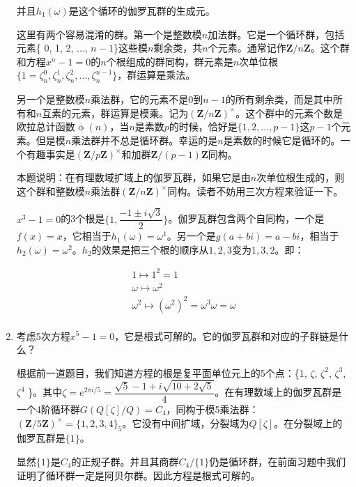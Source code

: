 \documentclass[UTF8]{article}
\begin{document}
\begin{enumerate}
并且$h_1(\omega)$是这个循环的伽罗瓦群的生成元。

\begin{mdframed}
这里有两个容易混淆的群。第一个是整数模$n$加法群。它是一个循环群，包括元素\{ 0, 1, 2, ..., $n - 1$\}这些模$n$剩余类，共$n$个元素。通常记作$\pmb{Z}/n\pmb{Z}$。这个群和方程$x^n - 1 = 0$的$n$个根组成的群同构，群元素是$n$次单位根$\{1 = \zeta_n^0, \zeta_n^1, \zeta_n^2, ..., \zeta_n^{n-1}\}$，群运算是乘法。

\vspace{5mm}

另一个是整数模$n$乘法群，它的元素不是0到$n-1$的所有剩余类，而是其中所有和$n$互素的元素，群运算是模乘。记为$(\pmb{Z}/n\pmb{Z})^{\times}$。这个群中的元素个数是欧拉总计函数$\upphi(n)$，当$n$是素数$p$的时候，恰好是$\{1, 2, ..., p-1\}$这$p-1$个元素。但是模$n$乘法群并不总是循环群。幸运的是$n$是素数的时候它是循环的。一个有趣事实是$(\pmb{Z}/p\pmb{Z})^{\times}$和加群$\pmb{Z}/(p-1)\pmb{Z}$同构。

\vspace{5mm}

本题说明：在有理数域扩域上的伽罗瓦群，如果它是由$n$次单位根生成的，则这个群和整数模$n$乘法群$(\pmb{Z}/n\pmb{Z})^{\times}$同构。读者不妨用三次方程来验证一下。

$x^3 - 1 = 0$的3个根是$\{1, \dfrac{-1 \pm i \sqrt{3}}{2}\}$。伽罗瓦群包含两个自同构，一个是$f(x) = x$，它相当于$h_1(\omega) = \omega^1$。另一个是$g(a + bi) = a - bi$，相当于$h_2(\omega) = \omega^2$。$h_2$的效果是把三个根的顺序从$1, 2, 3$变为$1, 3, 2$。即：

\[
\begin{array}{l}
1 \mapsto 1^2 = 1 \\
\omega \mapsto \omega^2 \\
\omega^2 \mapsto (\omega^2)^2 = \omega^3 \omega = \omega \\
\end{array}
\]

\end{mdframed}

\item {考虑5次方程$x^5 - 1 = 0$，它是根式可解的。它的伽罗瓦群和对应的子群链是什么？}

根据前一道题目，我们知道方程的根是复平面单位元上的5个点：\{1, $\zeta$, $\zeta^2$, $\zeta^3$, $\zeta^4$ \}。其中$\zeta = e^{2 \pi i / 5} = \dfrac{\sqrt{5} - 1 + i\sqrt{10 + 2 \sqrt{5}}}{4}$。在有理数域上的伽罗瓦群是一个4阶循环群$G(Q[\zeta]/Q) = C_4$，同构于模5乘法群：$(\pmb{Z}/5\pmb{Z})^{\times} = \{1, 2, 3, 4 \}_5$。它没有中间扩域，分裂域为$Q[\zeta]$。在分裂域上的伽罗瓦群是$\{1\}$。

显然$\{1\}$是$C_4$的正规子群。并且其商群$C_4/\{1\}$仍是循环群，在前面习题中我们证明了循环群一定是阿贝尔群。因此方程是根式可解的。

\end{enumerate}
\end{document}
